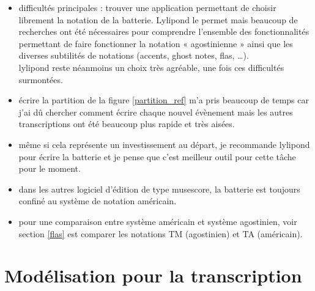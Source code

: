 \begin{itemize}
    \item difficultés principales : trouver une application permettant de
        choisir librement la notation de la batterie. Lylipond le permet mais
        beaucoup de recherches ont été nécessaires pour comprendre l’ensemble
        des fonctionnalités permettant de faire fonctionner la notation
        « agostinienne » ainsi que les diverses subtilités de notations
        (accents, ghost notes, flas, …).\\
        lylipond reste néanmoins un choix très agréable, une fois ces
        difficultés surmontées.
    \item écrire la partition de la figure \ref{partition_ref} m’a pris
        beaucoup de temps car j’ai dû chercher comment écrire chaque nouvel
        évènement mais les autres transcriptions ont été beaucoup plus rapide
        et très aisées.
    \item même si cela représente un investissement au départ, je recommande
        lylipond pour écrire la batterie et je pense que c’est meilleur outil
        pour cette tâche pour le moment.
    \item dans les autres logiciel d’édition de type musescore, la batterie
        est toujours confiné au système de notation américain.
    \item pour une comparaison entre système américain et système agostinien,
        voir section \ref{flas} est comparer les notations TM (agostinien) et
        TA (américain).
\end{itemize}


\section{Modélisation pour la transcription}
\label{modelisation_transcription}
